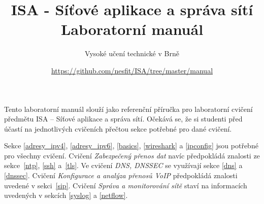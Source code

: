 \documentclass[a4paper,11pt]{article}
\title{ISA - Síťové aplikace a správa sítí\\
{\bf\large Laboratorní manuál}}
\author{Vysoké učení technické v Brně}
\date{\url{https://github.com/nesfit/ISA/tree/master/manual}}
\begin{document}
{\let\newpage\relax\maketitle}

Tento laboratorní manuál slouží jako referenční příručka pro laboratorní cvičení
předmětu ISA -- Síťové aplikace a správa sítí. Očekává se, že si studenti před
účastí na jednotlivých cvičeních přečtou sekce potřebné pro dané cvičení.

Sekce \ref{adresy_ipv4}, \ref{adresy_ipv6}, \ref{basics}, \ref{wireshark} a \ref{ipconfig} jsou
potřebné pro všechny cvičení. Cvičení \emph{Zabezpečený přenos dat} navíc
předpokládá znalosti ze sekce~\ref{ntp}, \ref{ssh} a~\ref{tls}. Ve cvičení \emph{DNS,
DNSSEC} se využívají sekce \ref{dns} a \ref{dnssec}. Cvičení
\emph{Konfigurace a analýza přenosů VoIP} předpokládá znalosti uvedené v
sekci~\ref{sip}. Cvičení \emph{Správa a monitorování sítě} staví na informacích
uvedených v sekcích \ref{syslog} a \ref{netflow}.

\setcounter{tocdepth}{1}
\tableofcontents
\newpage












\newpage




\newpage
\thispagestyle{empty}
\end{document}
